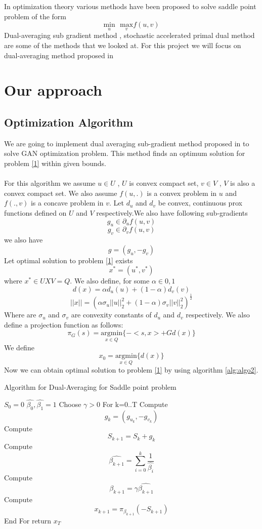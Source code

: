 \documentclass{article}
\begin{document}
In optimization theory  various methods have been proposed to solve saddle point problem of the form \\
\begin{equation}\label{1}
\underset{u}{\text{min}} \text{  }\underset{v} {\text{max}} f(u,v)
\end{equation}
Dual-averaging sub gradient method \cite{nesterov_primal-dual_2009}, stochastic accelerated primal dual method \cite{chen_optimal_2014} are some of the methods that we looked at. For this project we will focus on dual-averaging method proposed in \cite{nesterov_primal-dual_2009}
\section{Our approach}
\subsection{Optimization Algorithm}
We are going to implement dual averaging sub-gradient method proposed in \cite{nesterov_primal-dual_2009} to solve GAN optimization problem. This method finds an optimum solution for problem \ref{1} within given bounds. \\
\\For this algorithm we assume $u \in U$ , $U$ is convex compact set, $v \in V$ , $V$ is also a convex compact set. We also assume $f(u,.)$ is a convex problem in $u$ and $f(.,v)$ is a concave problem in $v$. Let $d_u$ and $d_v$ be convex, continuous prox functions defined on $U$ and $V$ respectively.We also have following sub-gradients
$$g_u \in \partial_uf(u,v)$$
$$g_v \in \partial_vf(u,v)$$
we also have
$$g=(g_u,-g_v)$$ Let optimal solution to problem \ref{1} exists $$x^*=(u^*,v^*)$$ where $x^* \in UXV = Q$. We also define, for some $\alpha \in{0,1}$
$$d(x)=\alpha d_u(u)+(1-\alpha)d_v(v)$$
$$||x|| =(\alpha\sigma_u||u||_2^2+(1-\alpha)\sigma_v||v||_2^2)^{\frac{1}{2}} $$
Where are $\sigma_u$ and $\sigma_v$ are convexity constants of $d_u$ and $d_v$ respectively. We also define a projection function as follows:
$$ \pi_G(s)= \underset{x \in Q}{\text{argmin}} \{ -<s,x>+Gd(x)\}$$
We define $$x_0 = \underset{x \in Q}{\text{argmin}} \{ d(x)\} $$
Now we can obtain optimal solution to problem \ref{1} by using algorithm \ref{alg:algo2}.
\begin{algorithm}
\caption{Algorithm for Dual-Averaging for Saddle point problem}
\label{alg:algo2}
\begin{algorithmic}[1]
\State $S_0=0$
\State $\hat{\beta_0},\hat{\beta_1}=1$
\State Choose $\gamma > 0$
\State For k=0..T
\State   Compute $$ g_k=(g_{u_k},-g_{v_k})$$
\State Compute $$S_{k+1}=S_{k}+g_k$$
\State Compute $$\hat{\beta_{k+1}}=\sum_{i=0}^k \frac{1}{\hat{\beta_i}}$$
\State Compute $$\beta_{k+1}=\gamma\hat{\beta_{k+1}}$$
\State Compute $$x_{k+1}=\pi_{\beta_{k+1}}(-S_{k+1})$$
\State End For
\State return $x_T$
\end{algorithmic}
\end{algorithm}
\end{document}
